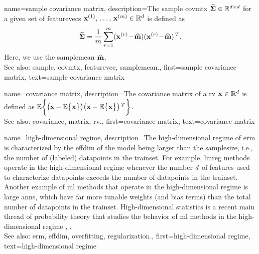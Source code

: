 	
{name={sample covariance matrix}, 
	description={The 
		\gls{sample} \gls{covmtx} $\widehat{\bf \Sigma} \in \mathbb{R}^{d \times d}$ 
		for a given set of \glspl{featurevec} ${\bf x}^{(1)}, \,\ldots, \,{\bf x}^{(m)} \in \mathbb{R}^{d}$ is defined as 
		$$\widehat{\bf \Sigma} = \frac{1}{m} \sum_{r=1}^{m} ({\bf x}^{(r)}\!-\!\widehat{{\bf m}}) ({\bf x}^{(r)}\!-\!\widehat{{\bf m}})\,^{T}.$$ 
		Here, we use the \gls{samplemean} $\widehat{{\bf m}}$. 
				\\
		See also: \gls{sample}, \gls{covmtx}, \gls{featurevec}, \gls{samplemean}.},
	first={sample covariance matrix},
	text={sample covariance matrix} 
}

{name={covariance matrix}, 
	description={The \gls{covariance} \gls{matrix} of a \gls{rv} ${\bf x} \in \mathbb{R}^{d}$ 
		is defined as $\mathbb{E} \bigg \{ \big( {\bf x} - \mathbb{E} \big\{ {\bf x} \big\} \big)  \big({\bf x} - \mathbb{E} \big\{ {\bf x} \big\} \big)\,^{T} \bigg\}$.
				\\
		See also: \gls{covariance}, \gls{matrix}, \gls{rv}.},
	first={covariance matrix},
	text={covariance matrix} 
}
	
{name={high-dimensional regime}, 
	description={The 
		high-dimensional regime of \gls{erm} is characterized by the \gls{effdim} of the \gls{model} 
		being larger than the \gls{samplesize}, i.e., the number of (labeled) \glspl{datapoint} in the \gls{trainset}. 
		For example, \gls{linreg} methods operate in the high-dimensional regime whenever the number $d$ of \glspl{feature} 
		used to characterize \glspl{datapoint} exceeds the number of \glspl{datapoint} in the \gls{trainset}. 
		Another example of \gls{ml} methods that operate in the high-dimensional regime is large \glspl{ann}, which have 
		far more tunable \gls{weights} (and bias terms) than the total number of \glspl{datapoint} in the \gls{trainset}. 
		High-dimensional statistics is a recent main thread of \gls{probability} theory that studies the 
		behavior of \gls{ml} methods in the high-dimensional regime \cite{Wain2019}, \cite{BuhlGeerBook}.
				\\
		See also: \gls{erm}, \gls{effdim}, \gls{overfitting}, \gls{regularization}.},
   	first={high-dimensional regime},
	text={high-dimensional regime} 
}

